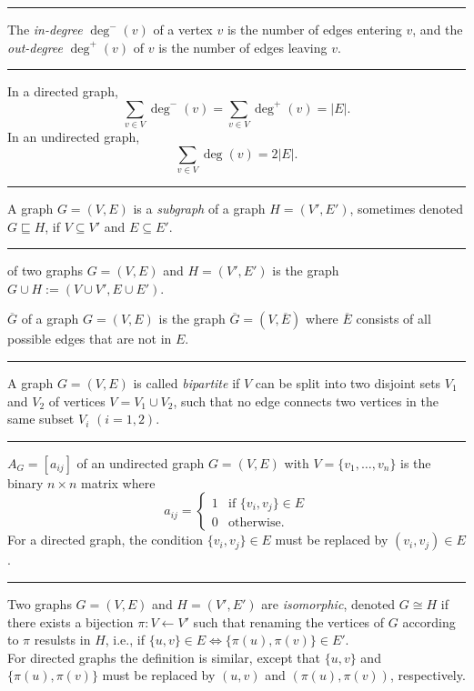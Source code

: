 \documentclass[a4paper]{extarticle}
\newcommand{\sep}{\vspace{5pt}\noindent\hrule\vspace{5pt}}
\begin{document}
\begin{multicols*}{2}
\sep

 The \emph{in-degree} $\deg^{-}(v)$ of a vertex $v$ is
the number of edges entering $v$, and the \emph{out-degree} $\deg^{+}(v)$ of $v$
is the number of edges leaving $v$.

\sep

 In a directed graph, 
\[
\sum_{v\in V} \deg^{-}(v) = \sum_{v\in V} \deg^{+}(v) = |E|.
\]
In an undirected graph,
\[
\sum_{v\in V} \deg(v) = 2|E|.
\] 

\sep

\Def[Subgraph] A graph $G = (V,E)$ is a \emph{subgraph} of a graph $H=(V',E')$,
sometimes denoted $G\sqsubseteq H$, if $V\subseteq V'$ and $E \subseteq E'$. 

\sep

\Def[Union] of two graphs $G=(V,E)$ and $H=(V',E')$ is the graph $G\cup H:=(V
\cup V', E\cup E')$.

\Def[Complement] $\overline{G}$ of a graph $G=(V,E)$ is the graph
$\overline{G}=(V,\overline{E})$ where $\overline{E}$ consists of all possible
edges that are not in $E$.

\sep

\Def[Bipartite] A graph $G=(V,E)$ is called \emph{bipartite} if $V$ can be split
into two disjoint sets $V_1$ and $V_2$ of vertices $V=V_1 \cup V_2$, such that no
edge connects two vertices in the same subset $V_i$ $(i=1,2)$. 

\sep

 $A_G=\left[a_{ij}\right]$ of an undirected
graph $G=(V,E)$ with $V=\{v_1,\ldots,v_n\}$ is the binary $n\times n$ matrix
where
\[
a_{ij} = \begin{cases}
1 & \text{if } \{v_i,v_j\} \in E\\
0 & \text{otherwise. }
\end{cases}
\]
For a directed graph, the condition $\{v_i,v_j\}\in E$ must be replaced by
$(v_i,v_j)\in E$. 

\sep

 Two graphs $G=(V,E)$ and $H=(V',E')$ are
\emph{isomorphic}, denoted $G\cong H$ if there exists a bijection $\pi \colon V
\leftarrow V'$ such that renaming the vertices of $G$ according to $\pi$
resulsts in $H$, i.e., if $\{u,v\}\in E \Longleftrightarrow \{\pi(u),\pi(v)\}\in
E'.$ \\
For directed graphs the definition is similar, except that $\{u,v\}$ and
$\{\pi(u),\pi(v)\}$ must be replaced by $(u,v)$ and $(\pi(u),\pi(v))$,
respectively.


\end{multicols*}
\end{document}
